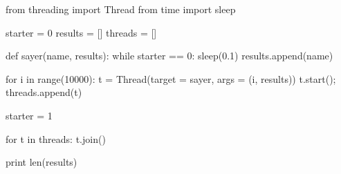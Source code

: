 \begin{GenericCode}
from threading import Thread
from time import sleep

starter = 0
results = []
threads = []

def sayer(name, results):
    while starter == 0:
        sleep(0.1)
    results.append(name)

for i in range(10000):
    t = Thread(target = sayer, args = (i, results))
    t.start();
    threads.append(t)

starter = 1

for t in threads:
    t.join()

print len(results)
\end{GenericCode}
